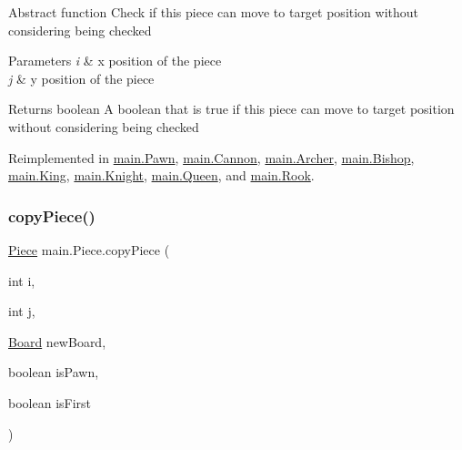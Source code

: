Abstract function Check if this piece can move to target position without considering being checked 
\begin{DoxyParams}{Parameters}
{\em i} & x position of the piece \\
\hline
{\em j} & y position of the piece \\
\hline
\end{DoxyParams}
\begin{DoxyReturn}{Returns}
boolean A boolean that is true if this piece can move to target position without considering being checked 
\end{DoxyReturn}


Reimplemented in \mbox{\hyperlink{classmain_1_1_pawn_a25b0e4665511cc671516a94744bf0798}{main.\+Pawn}}, \mbox{\hyperlink{classmain_1_1_cannon_a374dcf636c809bb25d652f16ac469ad6}{main.\+Cannon}}, \mbox{\hyperlink{classmain_1_1_archer_a568e88acab994677c762568e38a43679}{main.\+Archer}}, \mbox{\hyperlink{classmain_1_1_bishop_af5f01fb2a3efd5ded53c144baaaf990e}{main.\+Bishop}}, \mbox{\hyperlink{classmain_1_1_king_ad621a9ca71643c5542f024012c1771de}{main.\+King}}, \mbox{\hyperlink{classmain_1_1_knight_ae58baadc349750959356f3c235766fcf}{main.\+Knight}}, \mbox{\hyperlink{classmain_1_1_queen_af97cabf8dd28d4435faa4a26bc8625d7}{main.\+Queen}}, and \mbox{\hyperlink{classmain_1_1_rook_a53e4097e83f1ee1d0a093b1dc7efcffa}{main.\+Rook}}.

\mbox{\label{classmain_1_1_piece_a18021b3a461d8fcc4817da51402d0867}} 
\subsubsection{\texorpdfstring{copyPiece()}{copyPiece()}}
{\footnotesize\ttfamily \mbox{\hyperlink{classmain_1_1_piece}{Piece}} main.\+Piece.\+copy\+Piece (\begin{DoxyParamCaption}\item[{int}]{i,  }\item[{int}]{j,  }\item[{\mbox{\hyperlink{classmain_1_1_board}{Board}}}]{new\+Board,  }\item[{boolean}]{is\+Pawn,  }\item[{boolean}]{is\+First }\end{DoxyParamCaption})\hspace{0.3cm}{\ttfamily [inline]}}

